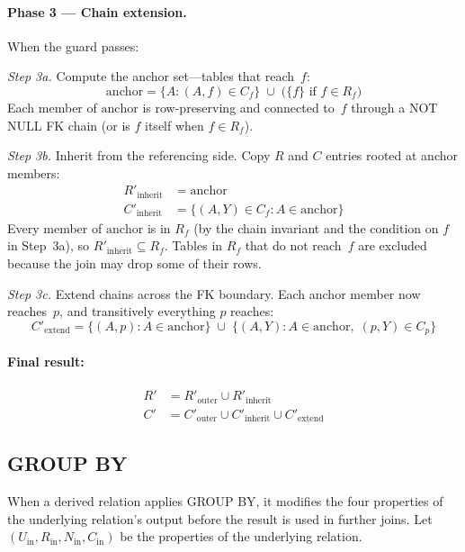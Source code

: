 \documentclass[11pt]{article}
\theoremstyle{definition}
\newcommand{\set}[1]{\{#1\}}
\newcommand{\Rf}{R_f}
\newcommand{\Cf}{C_f}
\newcommand{\Cp}{C_p}
\newcommand{\anchor}{\mathrm{anchor}}
\begin{document}
\paragraph{Phase 3 --- Chain extension.}
When the guard passes:

\medskip\noindent
\emph{Step 3a.}\; Compute the anchor set---tables that reach~$f$:
\[
  \anchor = \set{A : (A, f) \in \Cf}
    \;\cup\; \bigl(\set{f} \text{ if } f \in \Rf\bigr)
\]
Each member of $\anchor$ is row-preserving and connected to~$f$
through a NOT NULL FK chain (or is $f$ itself when $f \in \Rf$).

\medskip\noindent
\emph{Step 3b.}\; Inherit from the referencing side.  Copy $R$ and $C$
entries rooted at anchor members:
\begin{align*}
  R'_{\mathrm{inherit}} &= \anchor \\
  C'_{\mathrm{inherit}} &=
    \set{(A, Y) \in \Cf : A \in \anchor}
\end{align*}
Every member of $\anchor$ is in $\Rf$ (by the chain invariant and
the condition on $f$ in Step~3a), so
$R'_{\mathrm{inherit}} \subseteq \Rf$.  Tables in $\Rf$ that do not
reach~$f$ are excluded because the join may drop some of their rows.

\medskip\noindent
\emph{Step 3c.}\; Extend chains across the FK boundary.  Each anchor
member now reaches~$p$, and transitively everything $p$ reaches:
\[
  C'_{\mathrm{extend}} =
    \set{(A, p) : A \in \anchor}
    \;\cup\;
    \set{(A, Y) : A \in \anchor,\; (p, Y) \in \Cp}
\]

\paragraph{Final result:}
\begin{align*}
  R' &= R'_{\mathrm{outer}} \cup R'_{\mathrm{inherit}} \\
  C' &= C'_{\mathrm{outer}} \cup C'_{\mathrm{inherit}}
       \cup C'_{\mathrm{extend}}
\end{align*}


\subsection{GROUP BY}

When a derived relation applies GROUP BY, it modifies the four
properties of the underlying relation's output before the result is
used in further joins.  Let $(U_{\mathrm{in}}, R_{\mathrm{in}},
N_{\mathrm{in}}, C_{\mathrm{in}})$ be the properties of the
underlying relation.
\end{document}
